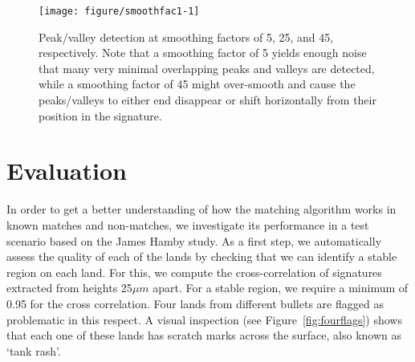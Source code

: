 \documentclass[aoas, preprint]{imsart}\usepackage[]{graphicx}\usepackage[]{color}
\newenvironment{knitrout}{}{} %
\begin{document}
\begin{figure}[hbtp]
  \centering
\begin{knitrout}
\color{fgcolor}
\texttt{[image: figure/smoothfac1-1]} 

\end{knitrout}
\caption{\label{fig:varysmooth} Peak/valley detection at smoothing factors of 5, 25, and 45, respectively. Note that a smoothing factor of 5 yields enough noise that many very minimal overlapping peaks and valleys are detected, while a smoothing factor of 45 might over-smooth and cause the peaks/valleys to either end disappear or shift  horizontally  from their position in the signature.}
\end{figure}



\section{Evaluation}
In order to get a better understanding of  how  the matching algorithm works in known matches and non-matches, we investigate its performance in a test scenario based on the James Hamby study.
As a first step, we automatically assess the quality of each of the lands by  checking that we can identify a stable region on each land. For this, we compute the cross-correlation of signatures extracted from heights 25$\mu m$ apart. For a stable region, we require a minimum of 0.95 for the cross correlation. Four lands from different bullets are flagged as problematic in this respect. A visual inspection (see Figure~\ref{fig:fourflags}) shows that each one of these lands has scratch marks across the surface, also known as `tank rash'.
%
\end{document}
